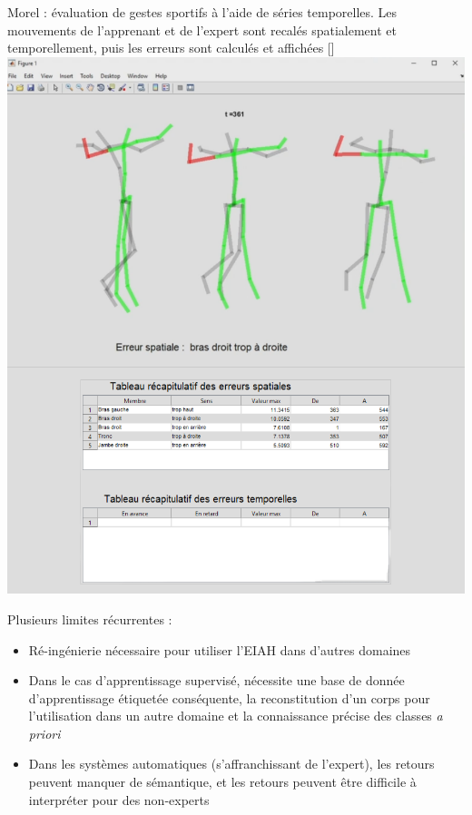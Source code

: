 \documentclass[svgnames]{beamer}
\newcommand{\mycite}[1]{[\textit{\cite{#1}}]}
\begin{document}
	\begin{frame}{\secname}
		 Morel : évaluation de gestes sportifs à l'aide de séries temporelles. Les mouvements de l'apprenant et de l'expert sont recalés spatialement et temporellement, puis les erreurs sont calculés et affichées \mycite{Morel2017Mts}\\
		\centering
		\includegraphics[scale=0.25]{img/eiah_morel.png}
	\end{frame}
	
	\begin{frame}{\secname}
		Plusieurs limites récurrentes :
		\begin{itemize}[label=$\bullet$]
			\item Ré-ingénierie nécessaire pour utiliser l'EIAH dans d'autres domaines
			\item Dans le cas d'apprentissage supervisé, nécessite une base de donnée d'apprentissage étiquetée conséquente, la reconstitution d'un corps pour l'utilisation dans un autre domaine et la connaissance précise des classes \textit{a priori}
			\item Dans les systèmes automatiques (s'affranchissant de l'expert), les retours peuvent manquer de sémantique, et les retours peuvent être difficile à interpréter pour des non-experts
		\end{itemize}
	\end{frame}
	
\end{document}
